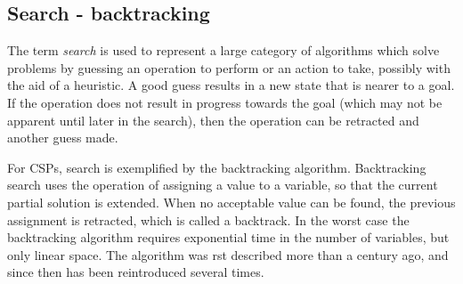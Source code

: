 \documentclass{article}
\begin{document}
\subsection{Search - backtracking}
The term \textit{search} is used to represent a large category of algorithms which solve
problems by guessing an operation to perform or an action to take, possibly
with the aid of a heuristic. A good guess results in a new state
that is nearer to a goal. If the operation does not result in progress towards the
goal (which may not be apparent until later in the search), then the operation
can be retracted and another guess made.


For CSPs, search is exemplified by the backtracking algorithm. Backtracking
search uses the operation of assigning a value to a variable, so that the current
partial solution is extended. When no acceptable value can be found, the previous assignment is retracted, which is called a backtrack. In the worst case the
backtracking algorithm requires exponential time in the number of variables,
but only linear space. The algorithm was rst described more than a century
ago, and since then has been reintroduced several times.
\end{document}
